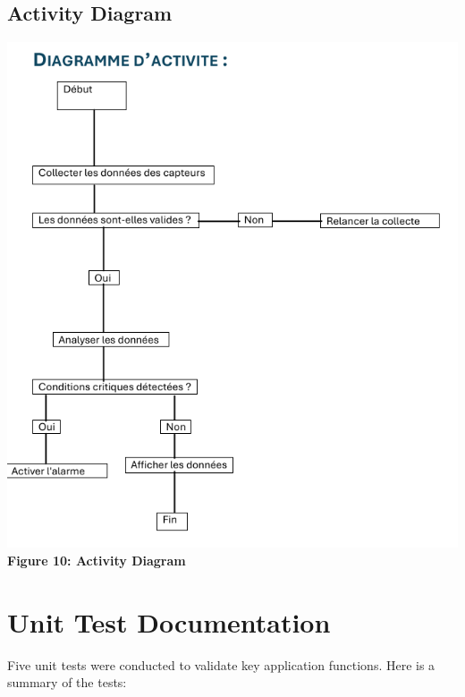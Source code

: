 \documentclass[a4paper,12pt]{article}
\begin{document}
	\subsection{Activity Diagram}
	\begin{center}
		\includegraphics[width=\textwidth]{activity_diagram.png}\\
		\textbf{Figure 10: Activity Diagram}
	\end{center}
	

\section{Unit Test Documentation}
Five unit tests were conducted to validate key application functions. Here is a summary of the tests:
\end{document}
